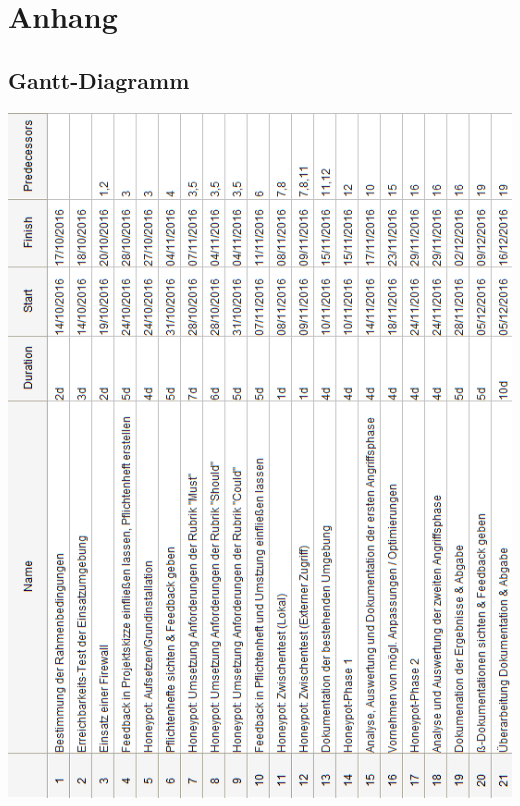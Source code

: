 \appendix

\chapter{Anhang}
\label{ch:Anhang}

\section*{Gantt-Diagramm}
\label{app:Gantt-Diagramm}


\begin{center}
\includegraphics[scale=0.83]{img/gantt_tasks.png}
\end{center}

\newpage


